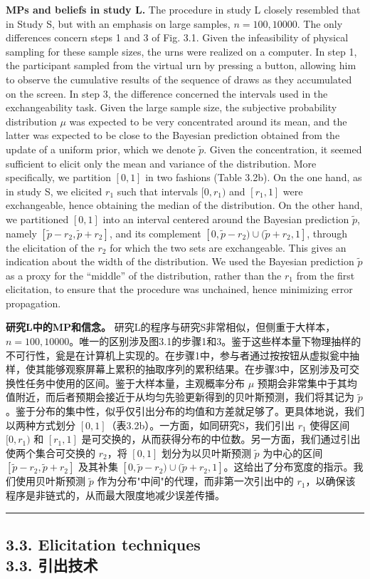 \documentclass[12pt,a4paper]{article}
\newenvironment{original}
  {\par\vspace{0.5em}\noindent\color{black}\ignorespaces}
  {\par\vspace{0.3em}}
\newenvironment{translation}
  {\par\noindent\color{transblue}\ignorespaces}
  {\par\vspace{0.8em}\hrule\vspace{0.5em}}
\newcommand{\bilingualsubsection}[2]{%
  \subsection{\texorpdfstring{#1 \\[0.2em] {\normalsize\color{transblue}#2}}{#1}}
}
\begin{document}
\begin{original}
\textbf{MPs and beliefs in study L.} The procedure in study L closely resembled that in Study S, but with an emphasis on large samples, $n = 100, 10000$. The only differences concern steps 1 and 3 of Fig. 3.1. Given the infeasibility of physical sampling for these sample sizes, the urns were realized on a computer. In step 1, the participant sampled from the virtual urn by pressing a button, allowing him to observe the cumulative results of the sequence of draws as they accumulated on the screen. In step 3, the difference concerned the intervals used in the exchangeability task. Given the large sample size, the subjective probability distribution $\mu$ was expected to be very concentrated around its mean, and the latter was expected to be close to the Bayesian prediction obtained from the update of a uniform prior, which we denote $\tilde{p}$. Given the concentration, it seemed sufficient to elicit only the mean and variance of the distribution. More specifically, we partition $[0, 1]$ in two fashions (Table 3.2b). On the one hand, as in study S, we elicited $r_1$ such that intervals $[0, r_1)$ and $[r_1, 1]$ were exchangeable, hence obtaining the median of the distribution. On the other hand, we partitioned $[0, 1]$ into an interval centered around the Bayesian prediction $\tilde{p}$, namely $[\tilde{p} - r_2, \tilde{p} + r_2]$, and its complement $[0, \tilde{p} - r_2) \cup (\tilde{p} + r_2, 1]$, through the elicitation of the $r_2$ for which the two sets are exchangeable. This gives an indication about the width of the distribution. We used the Bayesian prediction $\tilde{p}$ as a proxy for the ``middle'' of the distribution, rather than the $r_1$ from the first elicitation, to ensure that the procedure was unchained, hence minimizing error propagation.
\end{original}

\begin{translation}
\textbf{研究L中的MP和信念。} 研究L的程序与研究S非常相似，但侧重于大样本，$n = 100, 10000$。唯一的区别涉及图3.1的步骤1和3。鉴于这些样本量下物理抽样的不可行性，瓮是在计算机上实现的。在步骤1中，参与者通过按按钮从虚拟瓮中抽样，使其能够观察屏幕上累积的抽取序列的累积结果。在步骤3中，区别涉及可交换性任务中使用的区间。鉴于大样本量，主观概率分布 $\mu$ 预期会非常集中于其均值附近，而后者预期会接近于从均匀先验更新得到的贝叶斯预测，我们将其记为 $\tilde{p}$。鉴于分布的集中性，似乎仅引出分布的均值和方差就足够了。更具体地说，我们以两种方式划分 $[0, 1]$（表3.2b）。一方面，如同研究S，我们引出 $r_1$ 使得区间 $[0, r_1)$ 和 $[r_1, 1]$ 是可交换的，从而获得分布的中位数。另一方面，我们通过引出使两个集合可交换的 $r_2$，将 $[0, 1]$ 划分为以贝叶斯预测 $\tilde{p}$ 为中心的区间 $[\tilde{p} - r_2, \tilde{p} + r_2]$ 及其补集 $[0, \tilde{p} - r_2) \cup (\tilde{p} + r_2, 1]$。这给出了分布宽度的指示。我们使用贝叶斯预测 $\tilde{p}$ 作为分布"中间"的代理，而非第一次引出中的 $r_1$，以确保该程序是非链式的，从而最大限度地减少误差传播。
\end{translation}
\bilingualsubsection{3.3. Elicitation techniques}{3.3. 引出技术}
\end{document}
